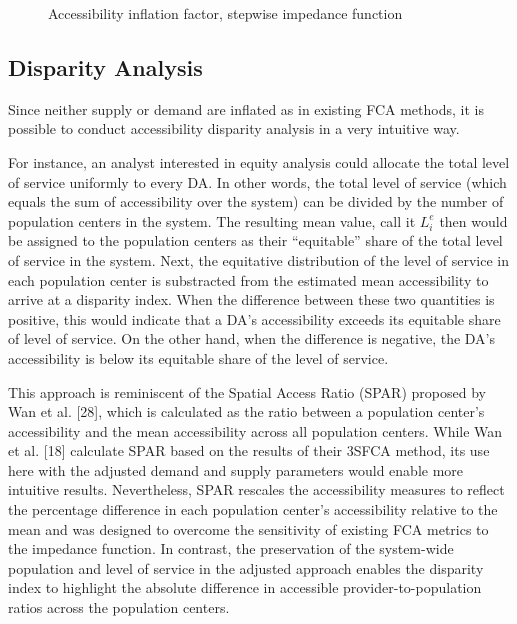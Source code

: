 \documentclass[10pt,letterpaper]{article}
\begin{document}
\begin{figure}[htbp]
\centering
\caption{\label{fig:fig13-map-accessibility-stepwise-comparison}Accessibility
inflation factor, stepwise impedance function}
\end{figure}

\subsection{Disparity Analysis}\label{disparity-analysis}

Since neither supply or demand are inflated as in existing FCA methods,
it is possible to conduct accessibility disparity analysis in a very
intuitive way.

For instance, an analyst interested in equity analysis could allocate
the total level of service uniformly to every DA. In other words, the
total level of service (which equals the sum of accessibility over the
system) can be divided by the number of population centers in the
system. The resulting mean value, call it \(L_i^e\) then would be
assigned to the population centers as their ``equitable'' share of the
total level of service in the system. Next, the equitative distribution
of the level of service in each population center is substracted from
the estimated mean accessibility to arrive at a disparity index. When
the difference between these two quantities is positive, this would
indicate that a DA's accessibility exceeds its equitable share of level
of service. On the other hand, when the difference is negative, the DA's
accessibility is below its equitable share of the level of service.

This approach is reminiscent of the Spatial Access Ratio (SPAR) proposed
by Wan et al. {[}28{]}, which is calculated as the ratio between a
population center's accessibility and the mean accessibility across all
population centers. While Wan et al. {[}18{]} calculate SPAR based on
the results of their 3SFCA method, its use here with the adjusted demand
and supply parameters would enable more intuitive results. Nevertheless,
SPAR rescales the accessibility measures to reflect the percentage
difference in each population center's accessibility relative to the
mean and was designed to overcome the sensitivity of existing FCA
metrics to the impedance function. In contrast, the preservation of the
system-wide population and level of service in the adjusted approach
enables the disparity index to highlight the absolute difference in
accessible provider-to-population ratios across the population centers.
\end{document}
